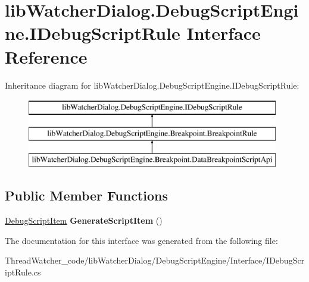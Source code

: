 \hypertarget{interfacelib_watcher_dialog_1_1_debug_script_engine_1_1_i_debug_script_rule}{\section{lib\+Watcher\+Dialog.\+Debug\+Script\+Engine.\+I\+Debug\+Script\+Rule Interface Reference}
\label{interfacelib_watcher_dialog_1_1_debug_script_engine_1_1_i_debug_script_rule}
}
Inheritance diagram for lib\+Watcher\+Dialog.\+Debug\+Script\+Engine.\+I\+Debug\+Script\+Rule\+:\begin{figure}[H]
\begin{center}
\leavevmode
\includegraphics[height=3.000000cm]{interfacelib_watcher_dialog_1_1_debug_script_engine_1_1_i_debug_script_rule}
\end{center}
\end{figure}
\subsection*{Public Member Functions}
\begin{DoxyCompactItemize}
\item 
\hypertarget{interfacelib_watcher_dialog_1_1_debug_script_engine_1_1_i_debug_script_rule_a205800bdbd965a0f2c82a707b609a7f7}{\hyperlink{classlib_watcher_dialog_1_1_property_item_1_1_debug_script_1_1_debug_script_item}{Debug\+Script\+Item} {\bfseries Generate\+Script\+Item} ()}\label{interfacelib_watcher_dialog_1_1_debug_script_engine_1_1_i_debug_script_rule_a205800bdbd965a0f2c82a707b609a7f7}

\end{DoxyCompactItemize}


The documentation for this interface was generated from the following file\+:\begin{DoxyCompactItemize}
\item 
Thread\+Watcher\+\_\+code/lib\+Watcher\+Dialog/\+Debug\+Script\+Engine/\+Interface/I\+Debug\+Script\+Rule.\+cs\end{DoxyCompactItemize}
